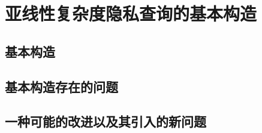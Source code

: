 \section{亚线性复杂度隐私查询的基本构造}

\subsection{基本构造}


\subsection{基本构造存在的问题}

\subsection{一种可能的改进以及其引入的新问题}